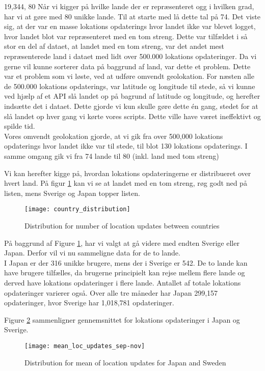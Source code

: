  19,344,  80 
Når vi kigger på hvilke lande der er repræsenteret ogg i hvilken grad, har vi at gøre med 80 unikke lande. Til at starte med lå dette tal på 74. Det viste sig, at der var en masse lokations opdaterings hvor landet ikke var blevet logget, hvor landet blot var repræsenteret med en tom streng. Dette var tilfældet i så stor en del af dataet, at landet med en tom streng, var det andet mest repræsenterede land i dataet med lidt over 500.000 lokations opdateringer. 
Da vi gerne vil kunne sorterer data på baggrund af land, var dette et problem. Dette var et problem som vi løste, ved at udføre omvendt geolokation. For næsten alle de 500.000 lokations opdaterings, var latitude og longitude til stede, så vi kunne ved hjælp af et API\cite{reversegeocode} slå landet op på bagrund af latitude og longitude, og herefter indsætte det i dataet. Dette gjorde vi kun skulle gøre dette én gang, stedet for at slå landet op hver gang vi kørte vores scripts. Dette ville have været ineffektivt og spilde tid.\\ 
Vores omvendt geolokation gjorde, at vi gik fra over 500,000 lokations opdaterings hvor landet ikke var til stede, til blot 130 lokations opdaterings. I samme omgang gik vi fra 74 lande til 80 (inkl. land med tom streng)

Vi kan herefter kigge på, hvordan lokations opdateringerne er distribueret over hvert land. På figur \ref{fig:country_dist} kan vi se at landet med en tom streng, røg godt ned på listen, mens Sverige og Japan topper listen. 


\begin{figure}[H]
    \centering
    \texttt{[image: country\_distribution]}
    \caption{Distribution for number of location updates between countries}
    \label{fig:country_dist}
\end{figure}

På baggrund af Figure \ref{fig:country_dist}, har vi valgt at gå videre med endten Sverige eller Japan. Derfor vil vi nu sammeligne data for de to lande. \\

I Japan er der 316 unikke brugere, mens der i Sverige er 542. De to lande kan have brugere tilfælles, da brugerne principielt kan rejse mellem flere lande og derved have lokations opdateringer i flere lande.  
Antallet af totale lokations opdateringer varierer også. Over alle tre måneder har Japan 299,157 opdateringer, hvor Sverige har 1,018,781 opdateringer.

Figure \ref{fig:mean_loc_updates_sep-nov} sammenligner gennemsnittet for lokations opdateringer i Japan og Sverige.
\begin{figure}[H]
    \centering
    \texttt{[image: mean\_loc\_updates\_sep-nov]}
    \caption{Distribution for mean of location updates for Japan and Sweden}
    \label{fig:mean_loc_updates_sep-nov}
\end{figure}

